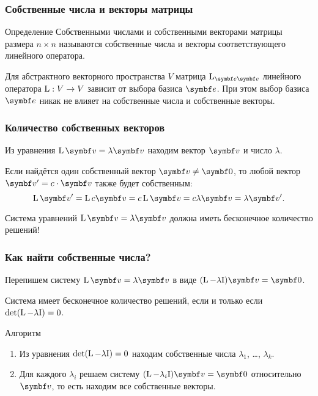         



\begin{frame}
    \frametitle{Собственные числа и векторы матрицы}

    \begin{block}{Определение}
        \alert{Собственными числами} и \alert{собственными векторами} матрицы размера $n\times n$ называются собственные числа и векторы 
        соответствующего линейного оператора.
    \end{block}
    \pause

    Для абстрактного векторного пространства $V$ матрица $\LL_{\be \be}$ линейного оператора $\operatorname{L}: V\to V$ зависит от выбора базиса $\be$.
    При этом выбор базиса $\be$ никак не влияет на собственные числа и собственные векторы. 
\end{frame}


\begin{frame}
    \frametitle{Количество собственных векторов}

    Из уравнения $\LL \bv = \lambda \bv$ находим вектор $\bv$ и число $\lambda$.

    \pause

    Если найдётся один собственный вектор $\bv \neq \bzero$, то любой вектор $\bv' = c \cdot \bv$ также будет собственным:
    \pause
    \[
    \LL \bv' = \LL c \bv = c \LL \bv = c \lambda \bv = \lambda \bv'.
    \]

    \pause
    Система уравнений $\LL \bv = \lambda \bv$ должна иметь бесконечное количество решений!


\end{frame}


\begin{frame}
    \frametitle{Как найти собственные числа?}

    Перепишем систему $\LL \bv = \lambda \bv$ в виде $(\LL - \lambda \Id) \bv = \bzero$.
    
    \pause

    Система имеет бесконечное количество решений, если и только если $\det (\operatorname{L} - \lambda \mathrm{I}) = 0$.

    \pause

    \begin{block}{Алгоритм}
        \begin{enumerate}
            \item Из уравнения $\det (\operatorname{L} - \lambda \mathrm{I}) = 0$ находим собственные числа $\lambda_1$, \ldots, $\lambda_k$. \pause
            \item Для каждого $\lambda_i$ решаем систему $(\LL - \lambda_i \Id) \bv = \bzero$ относительно $\bv$, то есть находим все собственные векторы. 
        \end{enumerate}
    \end{block}

    
\end{frame}



